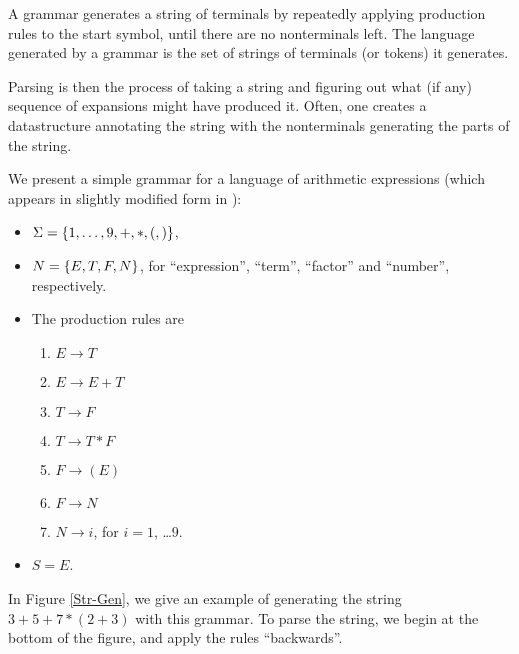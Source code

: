 A grammar generates a string of terminals by repeatedly applying production rules to the start symbol, until there are no nonterminals left.
The language generated by a grammar is the set of strings of terminals (or tokens) it generates.

Parsing is then the process of taking a string and figuring out what (if any) sequence of expansions might have produced it. Often, one creates a datastructure annotating the string with the nonterminals generating the parts of the string.

\begin{Example}
  \label{Arithmetic}
  We present a simple grammar for a language of arithmetic expressions (which appears in slightly modified form in \citep{Lange-Leiss}):
  \begin{itemize}
  \item $\Sigma = \{1,\ldots , 9, +, *, (, )\}$,
  \item $N = \{E, T, F, N\}$, for ``expression'', ``term'', ``factor'' and ``number'', respectively.
  \item The production rules are
    \begin{enumerate}
    \item \label{p1} $E \to T$
    \item \label{p2} $E \to E + T$
    \item \label{p3} $T \to F$
    \item \label{p4} $T \to T * F$ 
    \item \label{p5} $F \to ( E )$
    \item \label{p6} $F \to N$
    \item \label{p7} $N \to i$, for $i = 1$, \ldots $9$. 
    \end{enumerate}
  \item $S = E$.
  \end{itemize}
  In Figure \ref{Str-Gen}, we give an example of generating the string $3+5+7*(2+3) $ with this grammar. To parse the string, we begin at the bottom of the figure, and apply the rules ``backwards''.%
\end{Example}
